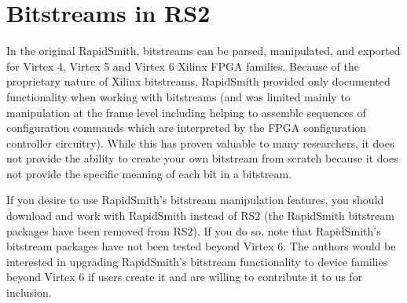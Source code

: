 \newpage
\section{Bitstreams in RS2}

In the original RapidSmith, bitstreams can be parsed, manipulated, and exported
for Virtex 4, Virtex 5 and Virtex 6 Xilinx FPGA families.  Because of the
proprietary nature of Xilinx bitstreams, RapidSmith provided only documented
functionality when working with bitstreams (and was limited mainly to
manipulation at the frame level including helping to assemble sequences of
configuration commands which are interpreted by the FPGA configuration
controller circuitry).  While this has proven valuable to many researchers, it
does not provide the ability to create your own bitstream from scratch because
it does not provide the specific meaning of each bit in a bitstream.

If you desire to use RapidSmith's bitstream manipulation features, you should
download and work with RapidSmith instead of RS2 (the RapidSmith bitstream
packages have been removed from RS2).  If you do so, note that RapidSmith's
bitstream packages have not been tested beyond Virtex 6.  The authors would be
interested in upgrading RapidSmith's bitstream functionality to device families
beyond Virtex 6 if users create it and are willing to contribute it to us for
inclusion.
